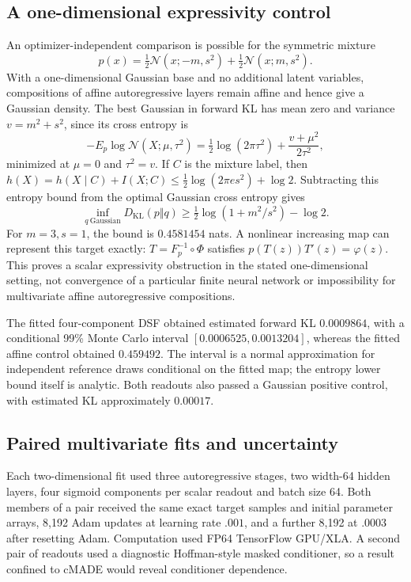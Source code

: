 \subsection{A one-dimensional expressivity control}

An optimizer-independent comparison is possible for the symmetric mixture
\[
p(x)=\tfrac12\mathcal N(x;-m,s^2)+\tfrac12\mathcal N(x;m,s^2).
\]
With a one-dimensional Gaussian base and no additional latent variables,
compositions of affine autoregressive layers remain affine and hence give a
Gaussian density. The best Gaussian in forward KL has mean zero and variance
$v=m^2+s^2$, since its cross entropy is
\begin{equation}
 -E_p\log\mathcal N(X;\mu,\tau^2)
 =\tfrac12\log(2\pi\tau^2)+\frac{v+\mu^2}{2\tau^2},
\end{equation}
minimized at $\mu=0$ and $\tau^2=v$. If $C$ is the mixture label, then
$h(X)=h(X\mid C)+I(X;C)\leq\tfrac12\log(2\pi e s^2)+\log2$.
Subtracting this entropy bound from the optimal Gaussian cross entropy gives
\begin{equation}
 \inf_{q\ \mathrm{Gaussian}}D_{\mathrm{KL}}(p\Vert q)
 \geq\tfrac12\log(1+m^2/s^2)-\log2.
 \label{eq:neutra-affine-expressivity-bound}
\end{equation}
For $m=3,s=1$, the bound is $0.4581454$ nats. A nonlinear increasing map can
represent this target exactly: $T=F_p^{-1}\circ\Phi$ satisfies
$p(T(z))T'(z)=\varphi(z)$. This proves a scalar expressivity obstruction in the
stated one-dimensional setting, not convergence of a particular finite neural
network or impossibility for multivariate affine autoregressive compositions.

The fitted four-component DSF obtained estimated forward KL $0.0009864$, with
a conditional 99\% Monte Carlo interval $[0.0006525,0.0013204]$, whereas the
fitted affine control obtained $0.459492$. The interval is a normal
approximation for independent reference draws conditional on the fitted map;
the entropy lower bound itself is analytic. Both readouts also passed a
Gaussian positive control, with estimated KL approximately $0.00017$.

\subsection{Paired multivariate fits and uncertainty}

Each two-dimensional fit used three autoregressive stages, two width-64 hidden
layers, four sigmoid components per scalar readout and batch size 64. Both
members of a pair received the same exact target samples and initial parameter
arrays, 8,192 Adam updates at learning rate $.001$, and a further 8,192 at
$.0003$ after resetting Adam. Computation used FP64 TensorFlow GPU/XLA. A
second pair of readouts used a diagnostic Hoffman-style masked conditioner,
so a result confined to cMADE would reveal conditioner dependence.

